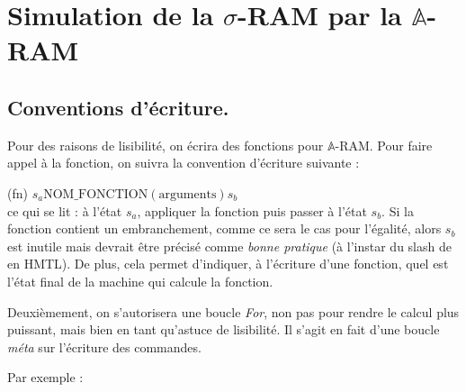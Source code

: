 \documentclass{report}
\newcommand{\bbA}{\mathbb{A}}
\begin{document}
			
			
			
			
			
			
			
			
			
			
			
			
			
			
		
			\begin{appendices}
				\label{appendices}
				
				\section{Simulation de la $\sigma$-RAM par la $\bbA$-RAM}
					\label{sec:annexes_programmes}
					
					\subsection{Conventions d'écriture.}
					\label{subsec:conventions_ecriture}
					Pour des raisons de lisibilité, on écrira des fonctions pour $\bbA$-RAM. Pour faire appel à la fonction, on suivra la convention d'écriture suivante : 
					
					(fn) 	$s_a \text{NOM\_FONCTION} (\text{arguments})s_b$\\
					ce qui se lit : à l'état $s_a$, appliquer la fonction puis passer à l'état $s_b$. Si la fonction contient un embranchement, comme ce sera le cas pour l'égalité, alors $s_b$ est inutile mais devrait être précisé comme \emph{bonne pratique} (à l'instar du slash de  en HMTL). De plus, cela permet d'indiquer, à l'écriture d'une fonction, quel est l'état final de la machine qui calcule la fonction.
					
					Deuxièmement, on s'autorisera une boucle \emph{For}, non pas pour rendre le calcul plus puissant, mais bien en tant qu'astuce de lisibilité. Il s'agit en fait d'une boucle \emph{méta} sur l'écriture des commandes.
					
					Par exemple :
					
					\espace
					
					\begin{algorithm}[H]
					\end{algorithm}
					

\end{appendices}
\end{document}
